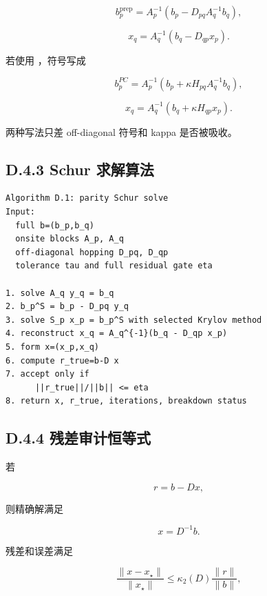 \documentclass[UTF8,a4paper,10pt]{ctexart}
\DeclareRobustCommand{\pycode}[1]{\texorpdfstring{\texttt{\seqsplit{#1}}}{#1}}
\begin{document}
\begin{displaymath}
b_p^{\mathrm{prep}} =A_p^{-1}\left(b_p-D_{pq}A_q^{-1}b_q\right),
\end{displaymath}

\begin{displaymath}
x_q=A_q^{-1}(b_q-D_{qp}x_p).
\end{displaymath}

若使用 \pycode{D=A-kappa H}，符号写成

\begin{displaymath}
b_p^{PC} =A_p^{-1}\left(b_p+\kappa H_{pq}A_q^{-1}b_q\right),
\end{displaymath}

\begin{displaymath}
x_q=A_q^{-1}\left(b_q+\kappa H_{qp}x_p\right).
\end{displaymath}

两种写法只差 off-diagonal 符号和 kappa 是否被吸收。

\subsection{D.4.3 Schur 求解算法}
\begin{Verbatim}[breaklines=true,breakanywhere=true,fontsize=\scriptsize]
Algorithm D.1: parity Schur solve
Input:
  full b=(b_p,b_q)
  onsite blocks A_p, A_q
  off-diagonal hopping D_pq, D_qp
  tolerance tau and full residual gate eta

1. solve A_q y_q = b_q
2. b_p^S = b_p - D_pq y_q
3. solve S_p x_p = b_p^S with selected Krylov method
4. reconstruct x_q = A_q^{-1}(b_q - D_qp x_p)
5. form x=(x_p,x_q)
6. compute r_true=b-D x
7. accept only if
      ||r_true||/||b|| <= eta
8. return x, r_true, iterations, breakdown status
\end{Verbatim}
\subsection{D.4.4 残差审计恒等式}
若

\begin{displaymath}
r=b-Dx,
\end{displaymath}

则精确解满足

\begin{displaymath}
x=D^{-1}b.
\end{displaymath}

残差和误差满足

\begin{displaymath}
\frac{\| x-x_\star\|}{\| x_\star\|} \le \kappa_2(D) \frac{\| r\|}{\| b\|},
\end{displaymath}
\end{document}
